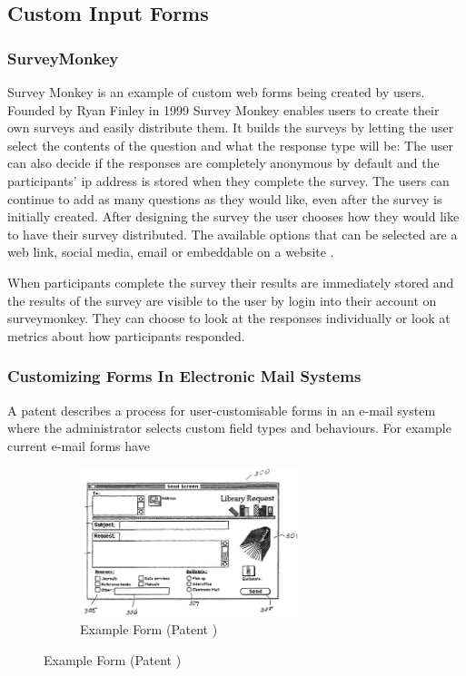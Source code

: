 \documentclass[12pt]{article}  %
\begin{document}
\subsection{Custom Input Forms}

\subsubsection{SurveyMonkey}
Survey Monkey \cite{finley_surveymonkey_1999} is an example of custom web forms being created by users. Founded by Ryan Finley in 1999 Survey Monkey enables users to create their own surveys and easily distribute them. It builds the surveys by letting the user select the contents of the question and what the response type will be: The user can also decide if the responses are completely anonymous by default and the participants’ ip address is stored when they complete the survey. The users can continue to add as many questions as they would like, even after the survey is initially created. After designing the survey the user chooses how they would like to have their survey distributed. The available options that can be selected are a web link, social media, email or embeddable on a website \cite{waclawski_how_2012} . 

When participants complete the survey their results are immediately stored and the results of the survey are visible to the user by login into their account on surveymonkey. They can choose to look at the responses individually or look at metrics about how participants responded.


\subsubsection{Customizing Forms In Electronic Mail Systems}
\noindent
A patent \cite{holt_customizing_2006} describes a process for user-customisable forms in an e-mail system where the administrator selects custom field types and behaviours.  For example current e-mail forms have 

\begin{figure}
\vspace*{-\baselineskip}
\begin{figure}[H]
  \includegraphics[width=0.7\textwidth]{images/emailform.png}
	\caption{Example Form (Patent \cite{holt_customizing_2006})}
	\label{fig:emailform}
\end{figure}
\end{figure}
\end{document}
